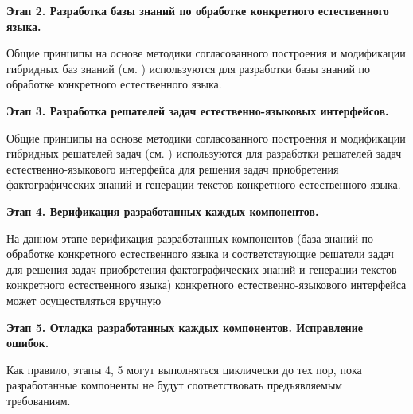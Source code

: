 \textbf{Этап 2. Разработка базы знаний по обработке конкретного естественного языка.}

Общие принципы на основе методики согласованного построения и модификации гибридных баз знаний (см. ) используются для разработки базы знаний по обработке конкретного естественного языка.

\textbf{Этап 3. Разработка решателей задач естественно-языковых интерфейсов.}

Общие принципы на основе методики согласованного построения и модификации гибридных решателей задач (см. ) используются для разработки решателей задач естественно-языкового интерфейса для решения задач приобретения фактографических знаний и генерации текстов конкретного естественного языка.

\textbf{Этап 4. Верификация разработанных каждых компонентов.}

На данном этапе верификация разработанных компонентов (база знаний по обработке конкретного естественного языка и соответствующие решатели задач для решения задач приобретения фактографических знаний и генерации текстов конкретного естественного языка) конкретного естественно-языкового интерфейса может осуществляться вручную

\textbf{Этап 5. Отладка разработанных каждых компонентов. Исправление ошибок.}

Как правило, этапы 4, 5 могут выполняться циклически до тех пор, пока разработанные компоненты не будут соответствовать предъявляемым требованиям.

